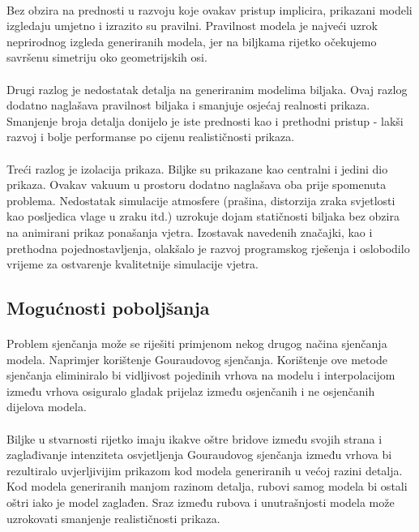 \documentclass[times, utf8, diplomski]{fer}
\begin{document}
\paragraph{}
Bez obzira na prednosti u razvoju koje ovakav pristup implicira, prikazani 
modeli izgledaju umjetno i izrazito su pravilni. Pravilnost modela je najveći
uzrok neprirodnog izgleda generiranih modela, jer na biljkama rijetko očekujemo
savršenu simetriju oko geometrijskih osi.
\paragraph{}
Drugi razlog je nedostatak detalja na generiranim modelima biljaka. Ovaj razlog 
dodatno naglašava pravilnost biljaka i smanjuje osjećaj realnosti prikaza.
Smanjenje broja detalja donijelo je iste prednosti kao i prethodni pristup - 
lakši razvoj i bolje performanse po cijenu realističnosti prikaza.
\paragraph{}
Treći razlog je izolacija prikaza. Biljke su prikazane kao centralni i jedini 
dio prikaza. Ovakav vakuum u prostoru dodatno naglašava oba prije spomenuta 
problema. Nedostatak simulacije atmosfere (prašina, distorzija zraka svjetlosti 
kao posljedica vlage u zraku itd.) uzrokuje dojam statičnosti biljaka bez
obzira na animirani prikaz ponašanja vjetra. Izostavak navedenih značajki, kao
i prethodna pojednostavljenja, olakšalo je razvoj programskog rješenja i 
oslobodilo vrijeme za ostvarenje kvalitetnije simulacije vjetra.

\subsection{Mogućnosti poboljšanja}
\paragraph{}
Problem sjenčanja može se riješiti primjenom nekog drugog načina sjenčanja 
modela. Naprimjer korištenje Gouraudovog sjenčanja. Korištenje ove metode 
sjenčanja eliminiralo bi vidljivost pojedinih vrhova na modelu i interpolacijom
između vrhova osiguralo gladak prijelaz između osjenčanih i ne osjenčanih 
dijelova modela. 
\paragraph{}
Biljke u stvarnosti rijetko imaju ikakve oštre bridove između svojih strana i 
zaglađivanje intenziteta osvjetljenja Gouraudovog sjenčanja između vrhova bi 
rezultiralo uvjerljivijim prikazom kod modela generiranih u većoj razini 
detalja. Kod modela generiranih manjom razinom detalja, rubovi samog modela bi
ostali oštri iako je model zaglađen. Sraz između rubova i unutrašnjosti modela
može uzrokovati smanjenje realističnosti prikaza.
\end{document}
